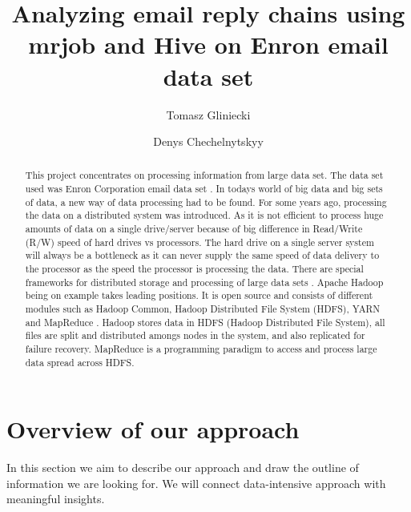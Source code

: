 \documentclass{llncs}
\begin{document}
\title{Analyzing email reply chains using mrjob and Hive on Enron email data set}
%
%
\author{Tomasz Gliniecki \and Denys Chechelnytskyy}
%
%
\maketitle              %
\begin{abstract}
This project concentrates on processing information from large data set. The data set used was Enron Corporation email data set \cite{data set}. In todays world of big data and big sets of data, a new way of data processing had to be found. For some years ago, processing the data on a distributed system was introduced. As it is not efficient to process huge amounts of data on a single drive/server because of big difference in Read/Write (R/W) speed of hard drives vs processors. The hard drive on a single server system will always be a bottleneck as it can never supply the same speed of data delivery to the processor as the speed the processor is processing the data. There are special frameworks for distributed storage and processing of large data sets \cite{hadoop wikipedia}. Apache Hadoop  being on example takes leading positions. It is open source and consists of different modules such as Hadoop Common, Hadoop Distributed File System (HDFS), YARN and MapReduce \cite{apache hadoop}. Hadoop stores data in HDFS (Hadoop Distributed File System), all files are split and distributed amongs nodes in the system, and also replicated for failure recovery. MapReduce is a programming paradigm to access and process large data spread across HDFS.
\end{abstract}

%
\section{Overview of our approach}

In this section we aim to describe our approach and draw the outline of information we are looking for. We will connect data-intensive approach with meaningful insights.
\end{document}
